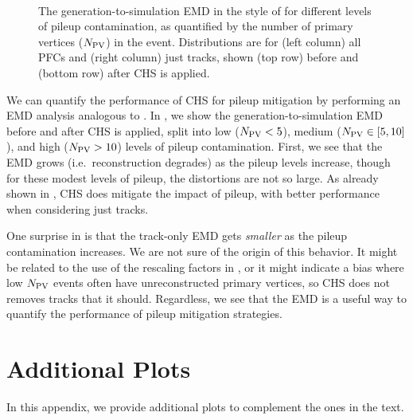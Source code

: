 \documentclass[aps,prd,twocolumn,preprintnumbers,nofootinbib,longbibliography,floatfix,superscriptaddress]{revtex4-1}
\begin{document}
\begin{figure*}
\\
\caption{
The generation-to-simulation EMD in the style of  for different levels of pileup contamination, as quantified by the number of primary vertices ($N_{\rm PV}$) in the event.
%
Distributions are for (left column) all PFCs and (right column) just tracks, shown (top row) before and (bottom row) after CHS is applied.
}
\label{fig:pileupEMDs}
\end{figure*}


We can quantify the performance of CHS for pileup mitigation by performing an EMD analysis analogous to .
%
In , we show the generation-to-simulation EMD before and after CHS is applied, split into low ($N_{\rm PV} < 5$), medium ($N_{\rm PV} \in [5,10]$), and high ($N_{\rm PV} > 10$) levels of pileup contamination.
%
First, we see that the EMD grows (i.e.~reconstruction degrades) as the pileup levels increase, though for these modest levels of pileup, the distortions are not so large.
%
As already shown in , CHS does mitigate the impact of pileup, with better performance when considering just tracks.


One surprise in  is that the track-only EMD gets \emph{smaller} as the pileup contamination increases.
%
We are not sure of the origin of this behavior.
%
It might be related to the use of the rescaling factors in , or it might indicate a bias where low $N_{\rm PV}$ events often have unreconstructed primary vertices, so CHS does not removes tracks that it should.
%
Regardless, we see that the EMD is a useful way to quantify the performance of pileup mitigation strategies.



\section{Additional Plots}
\label{app:additionalplots}


In this appendix, we provide additional plots to complement the ones in the text.
\end{document}

